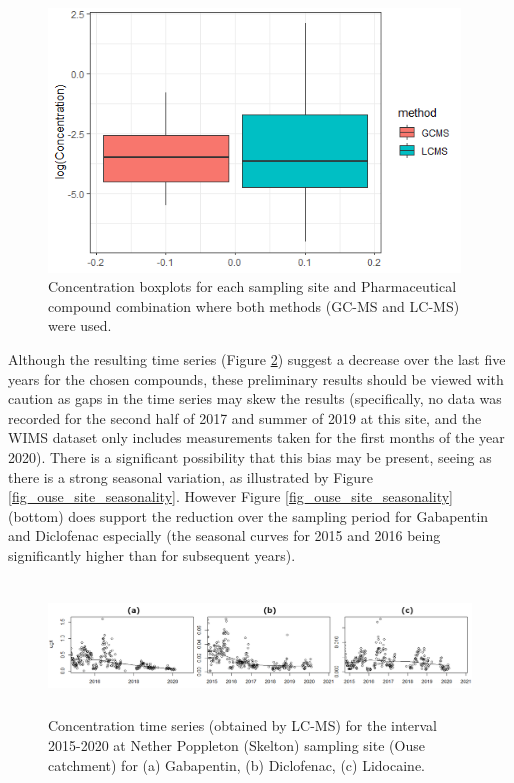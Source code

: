 \documentclass{article}
\begin{document}
\begin{figure}[h]
    \centering
    \includegraphics[height=7cm]{fig_boxplots.png}
    \caption{Concentration boxplots for each sampling site and Pharmaceutical compound combination
 where both methods (GC-MS and LC-MS) were used.}
    \label{fig_lc_gc_boxplot}
\end{figure}

Although the resulting time series (Figure \ref{fig_ouse_site_time_series}) suggest a decrease over the last five years for the chosen compounds, these preliminary results should be viewed with caution as gaps in the time series may skew the results (specifically, no data was recorded for the second half of 2017 and summer of 2019 at this site, and the WIMS dataset only includes measurements taken for the first months of the year 2020). There is a significant possibility that this bias may be present, seeing as there is a strong seasonal variation, as illustrated by Figure \ref{fig_ouse_site_seasonality}. However Figure \ref{fig_ouse_site_seasonality} (bottom) does support the reduction over the sampling period for Gabapentin and Diclofenac especially (the seasonal curves for 2015 and 2016 being significantly higher than for subsequent years).

\begin{figure}[h]
    \centering
    \includegraphics[height=3.5cm]{fig_time_series.png}
    \caption{Concentration time series (obtained by LC-MS) for the interval 2015-2020 at Nether Poppleton (Skelton) sampling site (Ouse catchment) 
for (a) Gabapentin, (b) Diclofenac, (c) Lidocaine.}
    \label{fig_ouse_site_time_series}
\end{figure}
\end{document}
